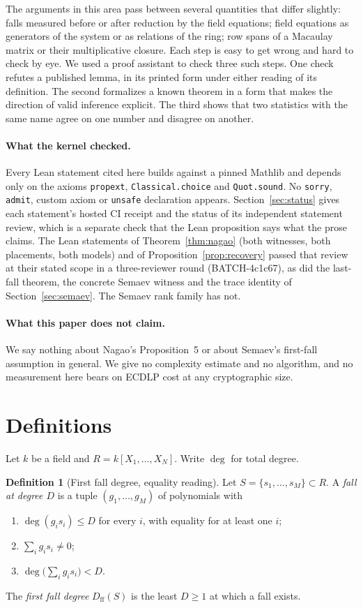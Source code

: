 \documentclass[11pt,a4paper]{article}
\theoremstyle{plain}
\theoremstyle{definition}
\newtheorem{definition}[theorem]{Definition}
\theoremstyle{remark}
\newcommand{\Dff}{D_{\mathrm{ff}}}
\begin{document}
The arguments in this area pass between several quantities that differ
slightly: falls measured before or after reduction by the field equations;
field equations as generators of the system or as relations of the ring; row
spans of a Macaulay matrix or their multiplicative closure. Each step is easy
to get wrong and hard to check by eye. We used a proof assistant to check
three such steps. One check refutes a published lemma, in its printed form
under either reading of its definition.
The second formalizes a known theorem in a form that makes the direction of
valid inference explicit. The third shows that two statistics with the same
name agree on one number and disagree on another.

\paragraph{What the kernel checked.} Every Lean statement cited here builds
against a pinned Mathlib and depends only on the axioms \texttt{propext},
\texttt{Classical.choice} and \texttt{Quot.sound}. No \texttt{sorry},
\texttt{admit}, custom axiom or \texttt{unsafe} declaration appears. Section~\ref{sec:status}
gives each statement's hosted CI receipt and the status of its independent
statement review, which is a separate check that the Lean proposition says
what the prose claims. The Lean statements of Theorem~\ref{thm:nagao} (both
witnesses, both placements, both models) and of Proposition~\ref{prop:recovery}
passed that review at their stated scope in a three-reviewer round
(BATCH-4c1c67), as did the last-fall theorem, the concrete Semaev witness and
the trace identity of Section~\ref{sec:semaev}. The Semaev rank family has
not.

\paragraph{What this paper does not claim.} We say nothing about Nagao's
Proposition~5 or about Semaev's first-fall assumption in general. We give no
complexity estimate and no algorithm, and no measurement here bears on
ECDLP cost at any cryptographic size.

\section{Definitions}\label{sec:defs}

Let $k$ be a field and $R=k[X_1,\dots,X_N]$. Write $\deg$ for total degree.

\begin{definition}[First fall degree, equality reading]\label{def:ff}
Let $S=\{s_1,\dots,s_M\}\subset R$. A \emph{fall at degree $D$} is a tuple
$(g_1,\dots,g_M)$ of polynomials with
\begin{enumerate}
\item $\deg(g_i s_i)\le D$ for every $i$, with equality for at least one $i$;
\item $\sum_i g_i s_i\neq 0$;
\item $\deg\bigl(\sum_i g_i s_i\bigr)<D$.
\end{enumerate}
The \emph{first fall degree} $\Dff(S)$ is the least $D\ge 1$ at which a fall
exists.
\end{definition}
\end{document}
